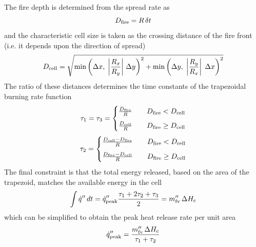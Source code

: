 The fire depth is determined from the spread rate as
\begin{equation}
D_{\rm fire} =  R \, \delta t
\end{equation}
and the characteristic cell size is taken as the crossing distance of the fire front (i.e. it depends upon the direction of spread)
\begin{equation}
D_{\rm cell} = \sqrt{\min \left(\Delta x, \; \left|\frac{R_x}{R_y}\right| \, \Delta y \right)^2 + 
\min \left(\Delta y, \; \left|\frac{R_y}{R_x}\right| \; \Delta x \right)^2}
\end{equation}
The ratio of these distances determines the time constants of the trapezoidal burning rate function
\begin{equation}
\tau_1 = \tau_3 = 
\begin{cases}
    \frac{D_{\rm fire}}{R} &  \quad D_{\rm fire} < D_{\rm cell} \\[6pt]
    \frac{D_{\rm cell}}{R} &  \quad D_{\rm fire} \ge D_{\rm cell}
\end{cases}
\end{equation}
\begin{equation}
\tau_2 = 
\begin{cases}
    \frac{D_{\rm cell} - D_{\rm fire}}{R} &  \quad D_{\rm fire} < D_{\rm cell} \\[6pt]
    \frac{D_{\rm fire} - D_{\rm cell}}{R} &  \quad D_{\rm fire} \ge D_{\rm cell}
\end{cases}
\end{equation}
The final constraint is that the total energy released, based on the area of the trapezoid, matches the available energy in the cell
\begin{equation}
\int \dot{q}'' \, dt = \dot{q}_{\rm peak}'' \frac{\tau_1 + 2\tau_2 + \tau_3}{2} = m_{\rm fv}'' \, \Delta H_{\rm c}
\end{equation}
which can be simplified to obtain the peak heat release rate per unit area 
\begin{equation}
\dot{q}_{\rm peak}'' = \frac{m_{\rm fv}'' \, \Delta H_{\rm c}}{\tau_1 + \tau_2}
\end{equation}

